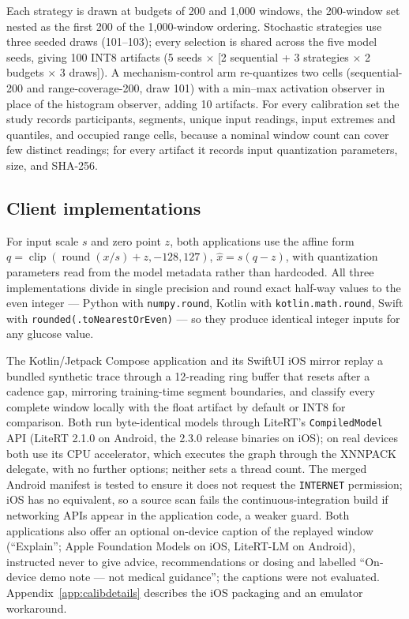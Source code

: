 \documentclass[10pt,twocolumn]{article}
\begin{document}
Each strategy is drawn at budgets of 200 and 1,000 windows, the 200-window
set nested as the first 200 of the 1,000-window ordering. Stochastic
strategies use three seeded draws (101--103); every selection is shared
across the five model seeds, giving 100 INT8 artifacts (5 seeds $\times$
[2 sequential + 3 strategies $\times$ 2 budgets $\times$ 3 draws]).
A mechanism-control arm re-quantizes two cells (sequential-200 and
range-coverage-200, draw 101) with a min--max activation observer in place
of the histogram observer, adding 10 artifacts. For every calibration set
the study records participants, segments, unique input readings, input
extremes and quantiles, and occupied range cells, because a nominal window
count can cover few distinct readings; for every artifact it records input
quantization parameters, size, and SHA-256.

\subsection{Client implementations}

For input scale $s$ and zero point $z$, both applications use the affine form
$q = \operatorname{clip}(\operatorname{round}(x/s)+z, -128,127)$,
$\hat{x}=s(q-z)$, with quantization parameters read from the model
metadata rather than hardcoded. All three implementations divide in single
precision and round exact half-way values to the even integer --- Python
with \texttt{numpy.round}, Kotlin with \texttt{kotlin.math.round}, Swift
with \texttt{rounded(.toNearestOrEven)}
\cite{numpyRound,kotlinRound,swiftRounding} --- so they produce identical
integer inputs for any glucose value.

The Kotlin/Jetpack Compose application and its SwiftUI iOS mirror replay a
bundled synthetic trace through a 12-reading ring buffer that resets after
a cadence gap, mirroring training-time segment boundaries, and classify
every complete window locally with the float artifact by default or INT8
for comparison. Both run byte-identical models through LiteRT's
\texttt{CompiledModel} API \cite{googleLiteRTCompiledModel} (LiteRT 2.1.0
on Android, the 2.3.0 release binaries on iOS); on real devices both use
its CPU accelerator, which executes the graph through the XNNPACK
delegate, with no further options; neither sets a thread count. The
merged Android manifest is tested to ensure it does not request the
\texttt{INTERNET} permission; iOS has no equivalent, so a source scan
fails the continuous-integration build if networking APIs appear in the
application code, a weaker guard. Both applications also offer an
optional on-device caption of the replayed window (``Explain''; Apple
Foundation Models on iOS, LiteRT-LM on Android), instructed never to give
advice, recommendations or dosing and labelled ``On-device demo note ---
not medical guidance''; the captions were not evaluated.
Appendix~\ref{app:calibdetails} describes the iOS packaging and an
emulator workaround.
\end{document}
